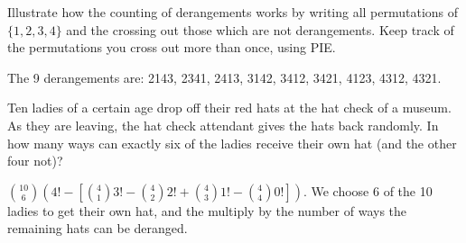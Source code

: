 \begin{questions}
\question Illustrate how the counting of derangements works by writing all permutations of $\{1,2,3,4\}$ and the crossing out those which are not derangements.  Keep track of the permutations you cross out more than once, using PIE.
	\begin{answer}
		The 9 derangements are: 2143, 2341, 2413, 3142, 3412, 3421, 4123, 4312, 4321.
	\end{answer}



\question Ten ladies of a certain age drop off their red hats at the hat check of a museum.  As they are leaving, the hat check attendant gives the hats back randomly.  In how many ways can exactly six of the ladies receive their own hat (and the other four not)?

	\begin{answer}
	${10 \choose 6}\left(4! - \left[{4 \choose 1} 3! - {4 \choose 2}2! + {4 \choose 3}1! - {4 \choose 4}0!\right]\right)$.  We choose 6 of the 10 ladies to get their own hat, and the multiply by the number of ways the remaining hats can be deranged. 
	\end{answer}
	
	



\end{questions}